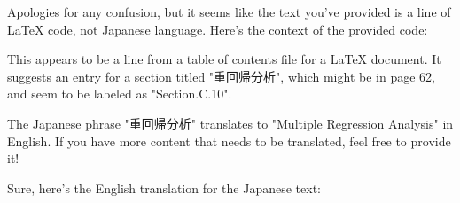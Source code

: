 \relax
\providecommand\hyper@newdestlabel[2]{}
Apologies for any confusion, but it seems like the text you've provided is a line of LaTeX code, not Japanese language. Here's the context of the provided code:

This appears to be a line from a table of contents file for a LaTeX document. It suggests an entry for a section titled "重回帰分析", which might be in page 62, and seem to be labeled as "Section.C.10".

The Japanese phrase "重回帰分析" translates to "Multiple Regression Analysis" in English. If you have more content that needs to be translated, feel free to provide it!

Sure, here's the English translation for the Japanese text:

